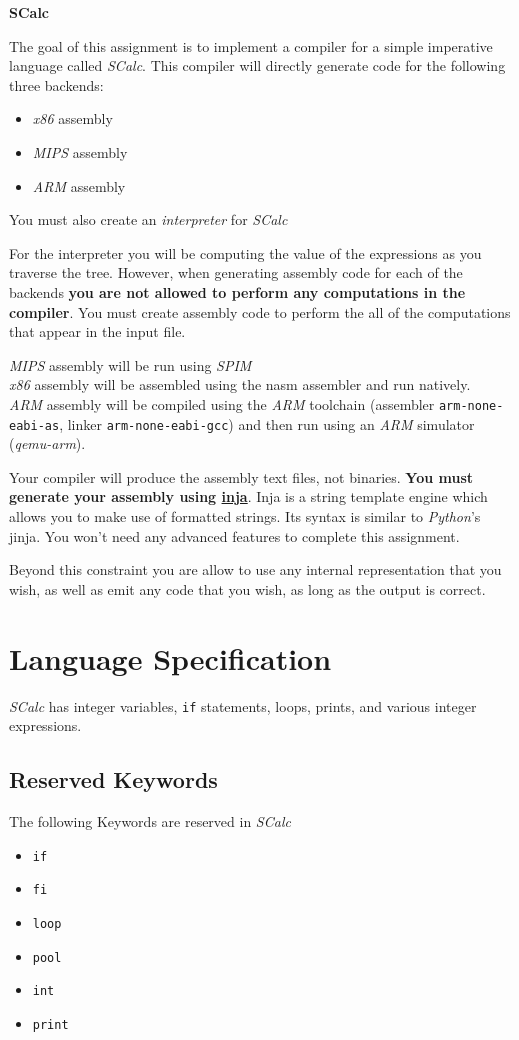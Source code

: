 \documentclass{article}
\newcommand{\code}[1]{\texttt{\textmd{#1}}}
\begin{document}
\ifpdf
	\LARGE
	\textbf{SCalc}
	\normalsize
\fi

The goal of this assignment is to implement a compiler for a simple imperative language called
\textit{SCalc}. This compiler will directly generate code for the following three backends:
\begin {itemize}
	\item \textit{x86} assembly
	\item \textit{MIPS} assembly
	\item \textit{ARM} assembly
\end {itemize}
You must also create an \textit{interpreter} for \textit{SCalc}

For the interpreter you will be computing the value of the expressions as you traverse the tree.
However, when generating assembly code for each of the backends \textbf{you are not allowed to
perform any computations in the compiler}. You must create assembly code to perform the all of the
computations that appear in the input file.

\textit{MIPS} assembly will be run using \textit{SPIM}\\
\textit{x86} assembly will be assembled using the nasm assembler and run natively.\\
\textit{ARM} assembly will be compiled using the \textit{ARM} toolchain (assembler
\code{arm-none-eabi-as}, linker \code{arm-none-eabi-gcc}) and then run using an \textit{ARM}
simulator (\textit{qemu-arm}).

Your compiler will produce the assembly text files, not binaries. \textbf{You must generate your
assembly using \href{https://github.com/pantor/inja}{inja}}. Inja is a string template engine which
allows you to make use of formatted strings. Its syntax is similar to \textit{Python}'s jinja. You
won't need any advanced features to complete this assignment.

Beyond this constraint you are allow to use any internal representation that you wish, as well as
emit any code that you wish, as long as the output is correct.

\section{Language Specification}
\textit{SCalc} has integer variables, \code{if} statements, loops, prints, and various integer expressions.
\subsection{Reserved Keywords}
The following Keywords are reserved in \textit{SCalc}
\begin {itemize}
	\item{\code{if}}
	\item{\code{fi}}
	\item{\code{loop}}
	\item{\code{pool}}
	\item{\code{int}}
	\item{\code{print}}
\end {itemize}
\end{document}
